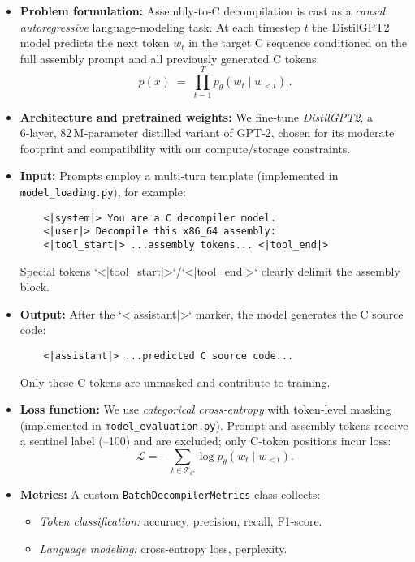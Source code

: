 \documentclass[../main.tex]{subfiles}
\begin{document}
\begin{itemize}
  \item \textbf{Problem formulation:}  
    Assembly‑to‑C decompilation is cast as a \emph{causal autoregressive} language‑modeling task. At each timestep \(t\) the DistilGPT2 model predicts the next token \(w_t\) in the target C sequence conditioned on the full assembly prompt and all previously generated C tokens:
    \[
      p(x) \;=\;\prod_{t=1}^{T} p_\theta(w_t \mid w_{<t})\,.
    \]

  \item \textbf{Architecture and pretrained weights:}  
    We fine‑tune \emph{DistilGPT2}, a 6‑layer, 82 M‑parameter distilled variant of GPT‑2, chosen for its moderate footprint and compatibility with our compute/storage constraints.

  \item \textbf{Input:}  
    Prompts employ a multi‑turn template (implemented in \texttt{model\_loading.py}), for example:
    \begin{verbatim}
    <|system|> You are a C decompiler model.
    <|user|> Decompile this x86_64 assembly:
    <|tool_start|> ...assembly tokens... <|tool_end|>
    \end{verbatim}
    Special tokens `<|tool_start|>`/`<|tool_end|>` clearly delimit the assembly block.

  \item \textbf{Output:}  
    After the `<|assistant|>` marker, the model generates the C source code:
    \begin{verbatim}
    <|assistant|> ...predicted C source code...
    \end{verbatim}
    Only these C tokens are unmasked and contribute to training.

  \item \textbf{Loss function:}  
    We use \emph{categorical cross‑entropy} with token‐level masking (implemented in \texttt{model\_evaluation.py}). Prompt and assembly tokens receive a sentinel label (–100) and are excluded; only C‑token positions incur loss:
    \[
      \mathcal{L} = -\!\!\sum_{t \in \mathcal{T}_C}\log p_\theta(w_t \mid w_{<t}).
    \]

  \item \textbf{Metrics:}  
    A custom \texttt{BatchDecompilerMetrics} class collects:
    \begin{itemize}
      \item \emph{Token classification:} accuracy, precision, recall, F1‑score.
      \item \emph{Language modeling:} cross‑entropy loss, perplexity.
    \end{itemize}
\end{itemize}
\end{document}
